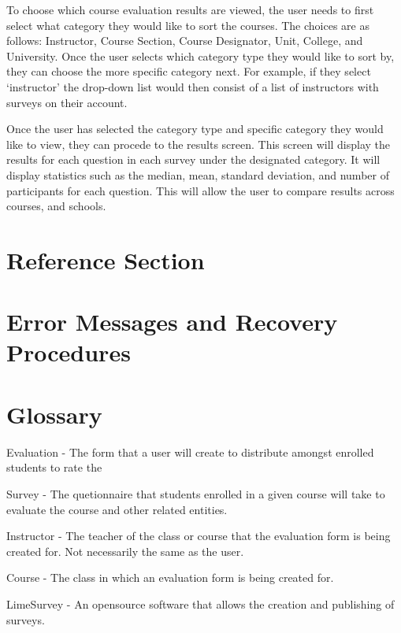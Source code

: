 \documentclass{article}
\begin{document}
To choose which course evaluation results are viewed, the user needs to first select what category they would like to sort the courses. The choices are as follows: Instructor, Course Section, Course Designator, Unit, College, and University. Once the user selects which category type they would like to sort by, they can choose the more specific category next. For example, if they select `instructor' the drop-down list would then consist of a list of instructors with surveys on their account. 

Once the user has selected the category type and specific category they would like to view, they can procede to the results screen. This screen will display the results for each question in each survey under the designated category. It will display statistics such as the median, mean, standard deviation, and number of participants for each question. This will allow the user to compare results across courses, and schools.

\section{Reference Section}



\appendix

\newpage
\section{Error Messages and Recovery Procedures}



\section{Glossary}

Evaluation - The form that a user will create to distribute amongst enrolled students to rate the 

Survey - The quetionnaire that students enrolled in a given course will take to evaluate the course and other related entities.

Instructor - The teacher of the class or course that the evaluation form is being created for. Not necessarily the same as the user.

Course - The class in which an evaluation form is being created for.

LimeSurvey - An opensource software that allows the creation and publishing of surveys.
\end{document}
